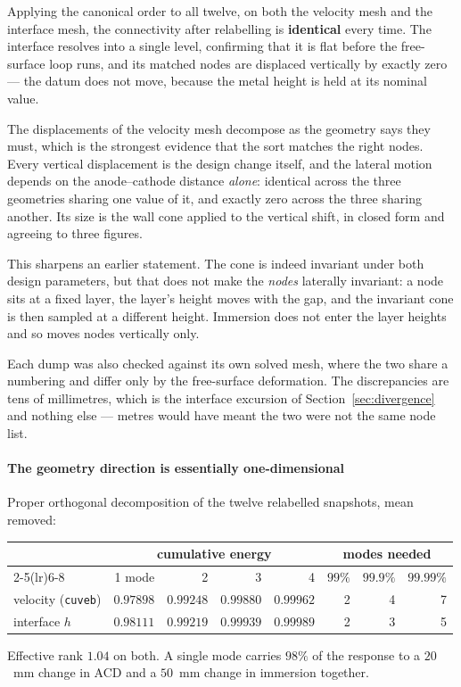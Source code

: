 \documentclass[11pt,a4paper]{article}
\theoremstyle{plain}
\theoremstyle{definition}
\theoremstyle{remark}
\begin{document}
Applying the canonical order to all twelve, on both the velocity mesh and the
interface mesh, the connectivity after relabelling is \textbf{identical} every
time. The interface resolves into a single level, confirming that it is flat
before the free-surface loop runs, and its matched nodes are displaced
vertically by exactly zero --- the datum does not move, because the metal height
is held at its nominal value.

The displacements of the velocity mesh decompose as the geometry says they must,
which is the strongest evidence that the sort matches the right nodes. Every
vertical displacement is the design change itself, and the lateral motion
depends on the anode--cathode distance \emph{alone}: identical across the three
geometries sharing one value of it, and exactly zero across the three sharing
another. Its size is the wall cone applied to the vertical shift, in closed form
and agreeing to three figures.

This sharpens an earlier statement. The cone is indeed invariant under both
design parameters, but that does not make the \emph{nodes} laterally invariant:
a node sits at a fixed layer, the layer's height moves with the gap, and the
invariant cone is then sampled at a different height. Immersion does not enter
the layer heights and so moves nodes vertically only.

Each dump was also checked against its own solved mesh, where the two share a
numbering and differ only by the free-surface deformation. The discrepancies are
tens of millimetres, which is the interface excursion of
Section~\ref{sec:divergence} and nothing else --- metres would have meant the
two were not the same node list.

\label{meas:gate1}
\paragraph{The geometry direction is essentially one-dimensional}
Proper orthogonal decomposition of the twelve relabelled snapshots, mean
removed:
\begin{center}
\small
\begin{tabular}{@{}lrrrrrrr@{}}
\toprule
& \multicolumn{4}{c}{cumulative energy} & \multicolumn{3}{c}{modes needed} \\
\cmidrule(lr){2-5}\cmidrule(lr){6-8}
& 1 mode & 2 & 3 & 4 & $99\%$ & $99.9\%$ & $99.99\%$ \\
\midrule
velocity (\texttt{cuveb}) & $0.97898$ & $0.99248$ & $0.99880$ & $0.99962$ & 2 & 4 & 7 \\
interface $h$             & $0.98111$ & $0.99219$ & $0.99939$ & $0.99989$ & 2 & 3 & 5 \\
\bottomrule
\end{tabular}
\end{center}
Effective rank $1.04$ on both. A single mode carries $98\%$ of the response to a
$20$~mm change in ACD and a $50$~mm change in immersion together.
\end{document}
